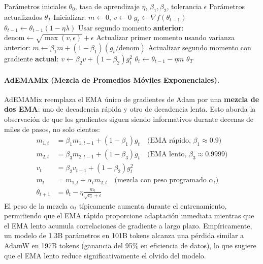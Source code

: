 \begin{algorithm}[H]
\caption{ADOPT (Adam con Ajuste Óptimo Podado)}
\label{alg:adopt}
\begin{algorithmic}[1]
\Require Parámetros iniciales $\theta_0$, tasa de aprendizaje $\eta$, $\beta_1, \beta_2$, tolerancia $\epsilon$
\Ensure Parámetros actualizados $\theta_T$
\State Inicializar: $m \gets 0$, $v \gets 0$
    \State $g_t \gets \nabla f(\theta_{t-1})$
        \State $\theta_{t-1} \gets \theta_{t-1}(1 - \eta\lambda)$
    \EndIf
    \State Usar segundo momento \textbf{anterior}: $\text{denom} \gets \sqrt{\max(v, \epsilon)} + \epsilon$
    \State Actualizar primer momento usando varianza anterior: $m \gets \beta_1 m + (1-\beta_1)(g_t / \text{denom})$
    \State Actualizar segundo momento con gradiente \textbf{actual}: $v \gets \beta_2 v + (1-\beta_2) g_t^2$
    \State $\theta_t \gets \theta_{t-1} - \eta m$
\EndFor
\Return $\theta_T$
\end{algorithmic}
\end{algorithm}

\paragraph{AdEMAMix (Mezcla de Promedios Móviles Exponenciales).}
AdEMAMix reemplaza el EMA único de gradientes de Adam por una \textbf{mezcla de dos EMA}: uno de decadencia rápida y otro de decadencia lenta. Esto aborda la observación de que los gradientes siguen siendo informativos durante decenas de miles de pasos, no solo cientos:
\begin{align}
m_{1,t} &= \beta_1 m_{1,t-1} + (1-\beta_1)g_t \quad\text{(EMA rápido, $\beta_1 \approx 0.9$)} \\
m_{2,t} &= \beta_3 m_{2,t-1} + (1-\beta_3)g_t \quad\text{(EMA lento, $\beta_3 \approx 0.9999$)} \\
v_t &= \beta_2 v_{t-1} + (1-\beta_2)g_t^2 \\
m_t &= m_{1,t} + \alpha_t m_{2,t} \quad\text{(mezcla con peso programado $\alpha_t$)} \\
\theta_{t+1} &= \theta_t - \eta\frac{m_t}{\sqrt{v_t}+\epsilon}
\end{align}
El peso de la mezcla $\alpha_t$ típicamente aumenta durante el entrenamiento, permitiendo que el EMA rápido proporcione adaptación inmediata mientras que el EMA lento acumula correlaciones de gradiente a largo plazo. Empíricamente, un modelo de 1.3B parámetros en 101B tokens alcanza una pérdida similar a AdamW en 197B tokens (ganancia del 95\% en eficiencia de datos), lo que sugiere que el EMA lento reduce significativamente el olvido del modelo.


